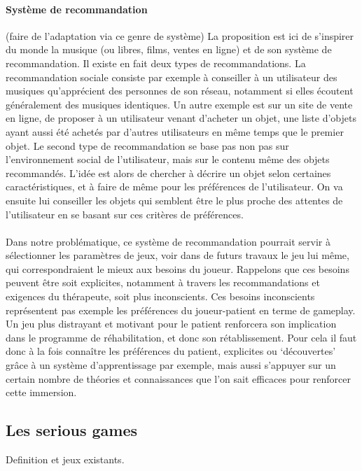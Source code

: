 			\paragraph{Système de recommandation \\}
(faire de l'adaptation via ce genre de système)
La proposition est ici de s'inspirer du monde la musique (ou libres, films, ventes en ligne) et de son système de recommandation. Il existe en fait deux types de recommandations. La recommandation sociale consiste par exemple à conseiller à un utilisateur des musiques qu'apprécient des personnes de son réseau, notamment si elles écoutent généralement des musiques identiques. Un autre exemple est sur un site de vente en ligne, de proposer à un utilisateur venant d'acheter un objet, une liste d'objets ayant aussi été achetés par d'autres utilisateurs en même temps que le premier objet.
Le second type de recommandation se base pas non pas sur l'environnement social de l'utilisateur, mais sur le contenu même des objets recommandés. L'idée est alors de chercher à décrire un objet selon certaines caractéristiques, et à faire de même pour les préférences de l'utilisateur. On va ensuite lui conseiller les objets qui semblent être le plus proche des attentes de l'utilisateur en se basant sur ces critères de préférences. 
 \paragraph{}
 Dans notre problématique, ce système de recommandation pourrait servir à sélectionner les paramètres de jeux, voir dans de futurs travaux le jeu lui même, qui correspondraient le mieux aux besoins du joueur. Rappelons que ces besoins peuvent être soit explicites, notamment à travers les recommandations et exigences du thérapeute, soit plus inconscients. Ces besoins inconscients représentent pas exemple les préférences du joueur-patient en terme de gameplay. Un jeu plus distrayant et motivant pour le patient renforcera son implication dans le programme de réhabilitation, et donc son rétablissement. Pour cela il faut donc à la fois connaître les préférences du patient, explicites ou `découvertes'  grâce à un système d'apprentissage par exemple, mais aussi s'appuyer sur un certain nombre de théories et connaissances que l'on sait efficaces pour renforcer cette immersion. 		
	\subsection{Les serious games}
Definition et jeux existants.	
